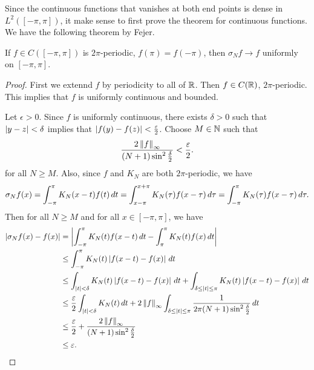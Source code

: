 \documentclass[a4paper]{article}
\begin{document}
Since the continuous functions that vanishes at both end
points is dense in $L^2([-\pi, \pi])$, it make sense
to first prove the theorem for continuous functions.
We have the following theorem by Fejer.

\begin{thm}[Fejer]
  If $f \in C([-\pi, \pi])$ is $2\pi$-periodic,
  $f(\pi) = f(-\pi)$, then
  $\sigma_N f \to f$ uniformly on $[-\pi, \pi]$.
\end{thm}

\begin{proof}
  First we extennd $f$ by periodicity to all of $\mathbb{R}$.
  Then $f \in C(\mathbb{R})$, $2\pi$-periodic. This implies that
  $f$ is uniformly continuous and bounded.

  Let $\epsilon > 0$. Since $f$ is uniformly continuous,
  there exists $\delta > 0$ such that $\left\lvert y - z\right\rvert < \delta$
  implies that $\left\lvert f(y) - f(z)\right\rvert < \frac{\varepsilon}{2}$.
  Choose $M \in \mathbb{N}$ such that
  \[
    \frac{2 \left\lVert f\right\rVert_\infty}{(N+1) \sin^2 \frac{\delta}{2}}
    < \frac{\varepsilon}{2}.
  \]
  for all $N \geq M$.
  Also, since $f$ and $K_N$ are both $2\pi$-periodic,
  we have
  \[
    \begin{aligned}
      \sigma_N f(x)
      = \int_{-\pi}^\pi K_N(x - t) f(t) \, d t
      = \int_{x - \pi}^{x + \pi} K_N(\tau) f(x - \tau) \, d \tau
      = \int_{-\pi}^{\pi} K_N(\tau) f(x - \tau) \, d \tau.
    \end{aligned}
  \]
  Then for all $N \geq M$ and for all $x \in [-\pi, \pi]$,
  we have
  \[
    \begin{aligned}
      \left\lvert \sigma_N f(x) - f(x)\right\rvert
       & = \left\lvert \int_{-\pi}^\pi K_N(t) f(x-t) \, d t -
             \int_\pi^\pi K_N(t) f(x) \, d t\right\rvert                          \\
       & \leq \int_{-\pi}^\pi K_N(t) \left\lvert f(x - t) - f(x)\right\rvert \, d t               \\
       & \leq \int_{\left\lvert t\right\rvert < \delta} K_N(t) \left\lvert f(x - t) - f(x)\right\rvert \, d t
      + \int_{\delta \leq \left\lvert t\right\rvert \leq \pi} K_N(t) \left\lvert f(x - t) - f(x)\right\rvert \, d t \\
       & \leq \frac{\varepsilon}{2} \int_{\left\lvert t\right\rvert < \delta}
      K_N(t) \, d t + 2 \left\lVert f\right\rVert_\infty \int_{\delta \leq \left\lvert t\right\rvert \leq \pi}
      \frac{1}{2\pi (N+1) \sin^2 \frac{\delta}{2}} \, d t                       \\
       & \leq \frac{\varepsilon}{2} + \frac{2 \left\lVert f\right\rVert_\infty}{(N+1)
                                     \sin^2 \frac{\delta}{2}}             \\
       & \leq \varepsilon.
    \end{aligned}
  \]
\end{proof}
\end{document}
